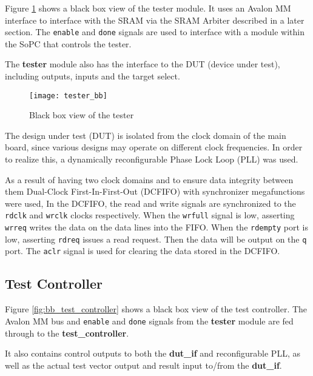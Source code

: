 Figure \ref{fig:bb_tester} shows a black box view of the tester module. It uses an Avalon MM interface
to interface with the SRAM via the SRAM Arbiter described in a later section. The \texttt{enable} and \texttt{done}
signals are used to interface with a module within the SoPC that controls the tester.

The \textbf{tester} module also has the interface to the DUT (device under test), including outputs, inputs and the target select.

\begin{figure}
 \centering
 \texttt{[image: tester\_bb]}
 \caption{Black box view of the tester}
 \label{fig:bb_tester}
\end{figure}


The design under test (DUT) is isolated from the clock domain of the main board,
since various designs may operate on different clock frequencies. In order to realize this,
a dynamically reconfigurable Phase Lock Loop (PLL) was used.

As a result of having two clock domains and to ensure data integrity between them Dual-Clock First-In-First-Out (DCFIFO) with synchronizer megafunctions were used,
In the DCFIFO, the read and write signals are synchronized to the \texttt{rdclk} and \texttt{wrclk} clocks respectively.
When the \texttt{wrfull} signal is low, asserting \texttt{wrreq} writes the data
on the data lines into the FIFO.
When the \texttt{rdempty} port is low, asserting \texttt{rdreq} issues a read request.
Then the data will be output on the \texttt{q} port.
The \texttt{aclr} signal is used for clearing the data stored in the DCFIFO.





\subsection{Test Controller}
Figure \ref{fig:bb_test_controller} shows a black box view of the test controller. The Avalon MM bus and
\texttt{enable} and \texttt{done} signals from the \textbf{tester} module are fed through
to the \textbf{test\_controller}.

It also contains control outputs to both the \textbf{dut\_if} and reconfigurable PLL, as well as the actual
test vector output and result input to/from the \textbf{dut\_if}.

